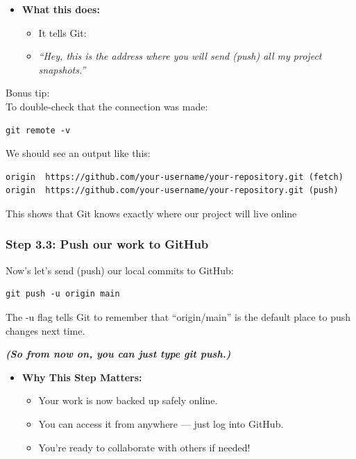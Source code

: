 \documentclass[
  11pt,
  a4paper,
]{article}
\begin{document}
\begin{itemize}
\item
  \textbf{What this does:}

  \begin{itemize}
  \item
    It tells Git:
  \item
    \emph{``Hey, this is the address where you will send (push) all my
    project snapshots.''}
  \end{itemize}
\end{itemize}

Bonus tip:\\
To double-check that the connection was made:

\begin{verbatim}
git remote -v 
\end{verbatim}

We should see an output like this:

\begin{verbatim}
origin  https://github.com/your-username/your-repository.git (fetch)
origin  https://github.com/your-username/your-repository.git (push)
\end{verbatim}

This shows that Git knows exactly where our project will live online

\subsubsection{Step 3.3: Push our work to
GitHub}\label{step-3.3-push-our-work-to-github}

Now's let's send (push) our local commits to GitHub:

\begin{verbatim}
git push -u origin main 
\end{verbatim}

The -u flag tells Git to remember that ``origin/main'' is the default
place to push changes next time.

\textbf{\emph{(So from now on, you can just type git push.)\\
}}

\begin{itemize}
\item
  \textbf{Why This Step Matters:}

  \begin{itemize}
  \item
    Your work is now backed up safely online.
  \item
    You can access it from anywhere --- just log into GitHub.
  \item
    You're ready to collaborate with others if needed!
  \end{itemize}
\end{itemize}
\end{document}
